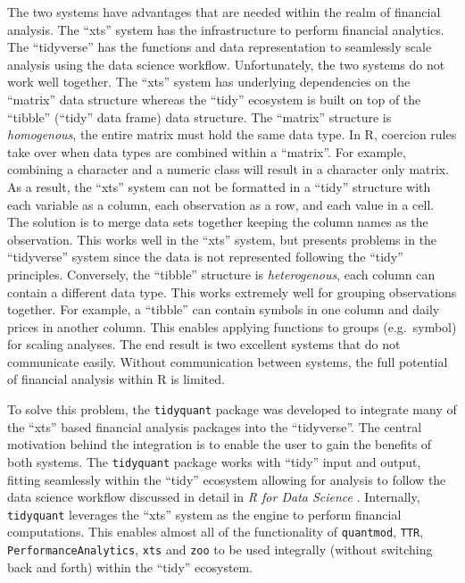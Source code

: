 The two systems have advantages that are needed within the realm of
financial analysis. The ``xts'' system has the infrastructure to perform
financial analytics. The ``tidyverse'' has the functions and data
representation to seamlessly scale analysis using the data science
workflow. Unfortunately, the two systems do not work well together. The
``xts'' system has underlying dependencies on the ``matrix'' data
structure whereas the ``tidy'' ecosystem is built on top of the
``tibble'' (``tidy'' data frame) data structure. The ``matrix''
structure is \emph{homogenous}, the entire matrix must hold the same
data type. In R, coercion rules take over when data types are combined
within a ``matrix''. For example, combining a character and a numeric
class will result in a character only matrix. As a result, the ``xts''
system can not be formatted in a ``tidy'' structure with each variable
as a column, each observation as a row, and each value in a cell. The
solution is to merge data sets together keeping the column names as the
observation. This works well in the ``xts'' system, but presents
problems in the ``tidyverse'' system since the data is not represented
following the ``tidy'' principles. Conversely, the ``tibble'' structure
is \emph{heterogenous}, each column can contain a different data type.
This works extremely well for grouping observations together. For
example, a ``tibble'' can contain symbols in one column and daily prices
in another column. This enables applying functions to groups
(e.g.~symbol) for scaling analyses. The end result is two excellent
systems that do not communicate easily. Without communication between
systems, the full potential of financial analysis within R is limited.

To solve this problem, the \texttt{tidyquant} package was developed to
integrate many of the ``xts'' based financial analysis packages into the
``tidyverse''. The central motivation behind the integration is to
enable the user to gain the benefits of both systems. The
\texttt{tidyquant} package works with ``tidy'' input and output, fitting
seamlessly within the ``tidy'' ecosystem allowing for analysis to follow
the data science workflow discussed in detail in \emph{R for Data
Science} \citep{R4DS2017}. Internally, \texttt{tidyquant} leverages the
``xts'' system as the engine to perform financial computations. This
enables almost all of the functionality of \texttt{quantmod},
\texttt{TTR}, \texttt{PerformanceAnalytics}, \texttt{xts} and
\texttt{zoo} to be used integrally (without switching back and forth)
within the ``tidy'' ecosystem.

